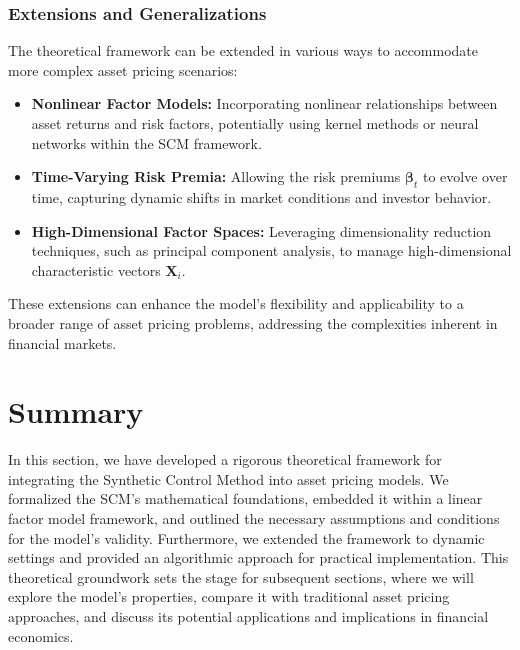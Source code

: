 \subsubsection{Extensions and Generalizations}

The theoretical framework can be extended in various ways to accommodate more complex asset pricing scenarios:

\begin{itemize}
    \item \textbf{Nonlinear Factor Models:} Incorporating nonlinear relationships between asset returns and risk factors, potentially using kernel methods or neural networks within the SCM framework.
    \item \textbf{Time-Varying Risk Premia:} Allowing the risk premiums $\boldsymbol{\beta}_t$ to evolve over time, capturing dynamic shifts in market conditions and investor behavior.
    \item \textbf{High-Dimensional Factor Spaces:} Leveraging dimensionality reduction techniques, such as principal component analysis, to manage high-dimensional characteristic vectors $\mathbf{X}_i$.
\end{itemize}

These extensions can enhance the model's flexibility and applicability to a broader range of asset pricing problems, addressing the complexities inherent in financial markets.

\section*{Summary}

In this section, we have developed a rigorous theoretical framework for integrating the Synthetic Control Method into asset pricing models. We formalized the SCM's mathematical foundations, embedded it within a linear factor model framework, and outlined the necessary assumptions and conditions for the model's validity. Furthermore, we extended the framework to dynamic settings and provided an algorithmic approach for practical implementation. This theoretical groundwork sets the stage for subsequent sections, where we will explore the model's properties, compare it with traditional asset pricing approaches, and discuss its potential applications and implications in financial economics.